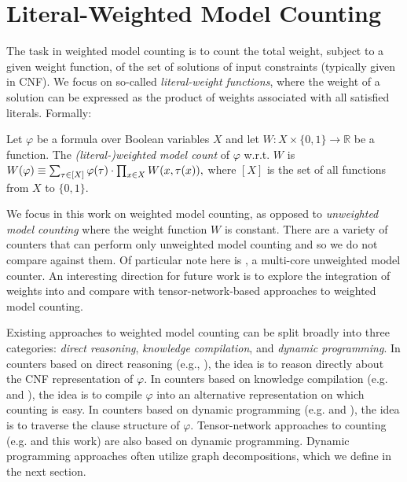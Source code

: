 \section{Literal-Weighted Model Counting}
\label{sec:wmc}
The task in weighted model counting is to count the total weight, subject to a given weight function, of the set of solutions of input constraints (typically given in CNF). We focus on so-called \emph{literal-weight functions}, where the weight of a solution can be expressed as the product of weights associated with all satisfied literals. Formally:
\begin{definition}
  Let $\varphi$ be a formula over Boolean variables $X$ and let $W: X \times \{0,1\} \rightarrow \mathbb{R}$ be a function. The \emph{(literal-)weighted model count} of $\varphi$ w.r.t. $W$ is
  $W(\varphi) \equiv \sum_{\tau \in [X]} \varphi(\tau) \cdot \prod_{x \in X} W(x, \tau(x)),$ where $[X]$ is the set of all functions from $X$ to $\{0, 1\}$.
\end{definition}

We focus in this work on weighted model counting, as opposed to \emph{unweighted model counting} where the weight function $W$ is constant. There are a variety of counters \cite{CW16,FHMW17,Thurley2006} that can perform only unweighted model counting and so we do not compare against them. Of particular note here is  \cite{BSB15}, a multi-core unweighted model counter. An interesting direction for future work is to explore the integration of weights into  and compare with tensor-network-based approaches to weighted model counting.

Existing approaches to weighted model counting can be split broadly into three categories: \emph{direct reasoning}, \emph{knowledge compilation}, and \emph{dynamic programming}. In counters based on direct reasoning (e.g.,  \cite{SBK05}), the idea is to reason directly about the CNF representation of $\varphi$. In counters based on knowledge compilation (e.g.  \cite{OD15} and  \cite{LM17}), the idea is to compile $\varphi$ into an alternative representation on which counting is easy. In counters based on dynamic programming (e.g.  \cite{DPV20} and  \cite{FHWZ18,FHZ19}), the idea is to traverse the clause structure of $\varphi$. Tensor-network approaches to counting (e.g.  \cite{DDV19} and this work) are also based on dynamic programming. Dynamic programming approaches often utilize graph decompositions, which we define in the next section. 


